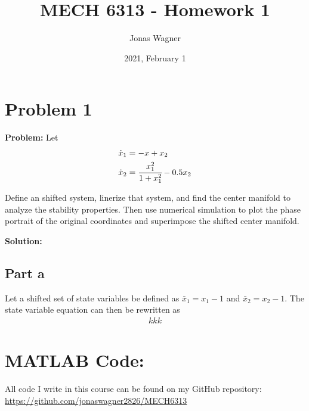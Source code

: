 \documentclass[letter]{article}
\title{MECH 6313 - Homework 1}
\author{Jonas Wagner}
\date{2021, February 1}
\begin{document}
\maketitle


\section{Problem 1}
\textbf{Problem:}
Let
\begin{equation}
	\begin{aligned}
		\dot{x}_1 &= -x + x_2\\
		\dot{x}_2 &= \cfrac{x_1^2}{1 + x_1^2} - 0.5 x_2
	\end{aligned}
\end{equation}

Define an shifted system, linerize that system, and find the center manifold to analyze the stability properties. Then use numerical simulation to plot the phase portrait of the original coordinates and superimpose the shifted center manifold.

\textbf{Solution:}
\subsection{Part a}
Let a shifted set of state variables be defined as $\bar{x}_1 = x_1 - 1$ and $\bar{x}_2 = x_2 - 1$. The state variable equation can then be rewritten as
\begin{equation}
	\begin{aligned}
		kkk
	\end{aligned}
\end{equation}



\newpage
\appendix
\section{MATLAB Code:}
All code I write in this course can be found on my GitHub repository:\\
\href{https://github.com/jonaswagner2826/MECH6313}{https://github.com/jonaswagner2826/MECH6313}

\end{document}
